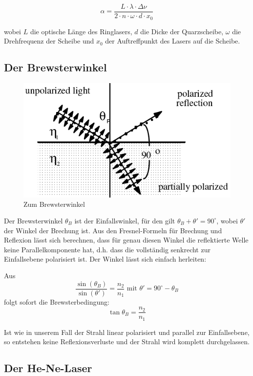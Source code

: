 \begin{equation} \alpha = \frac{L\cdot\lambda\cdot\Delta\nu}{2\cdot n\cdot\omega\cdot d \cdot x_0} \end{equation}

wobei $L$ die optische Länge des Ringlasers, $d$ die Dicke der Quarzscheibe, $\omega$ die Drehfrequenz der Scheibe und $x_0$ der Auftreffpunkt des Lasers auf die Scheibe.

\subsection{Der Brewsterwinkel}

\begin{figure}[H]
	\centering \includegraphics[width = 0.6 \textwidth]{Bilder/brewster.jpg}
	\caption{Zum Brewsterwinkel}
\end{figure}

Der Brewsterwinkel $\theta_B$ ist der Einfallswinkel, für den gilt $\theta_B + \theta' = 90^\circ$, wobei $\theta'$ der Winkel der Brechung ist. Aus den Fresnel-Formeln für Brechung und Reflexion lässt sich berechnen, dass für genau diesen Winkel die reflektierte Welle keine Parallelkomponente hat, d.h. dass die vollständig senkrecht zur Einfallsebene polarisiert ist. Der Winkel lässt sich einfach herleiten:

Aus $$ \frac{\sin(\theta_B)}{\sin(\theta')} = \frac{n_2}{n_1} \text{ \ mit \ } \theta' = 90^\circ - \theta_B$$ folgt sofort die Brewsterbedingung: 
\begin{equation} \tan\theta_B = \frac{n_2}{n_1} \end{equation}

Ist wie in unserem Fall der Strahl linear polarisiert und parallel zur Einfallsebene, so entstehen keine Reflexionsverluste und der Strahl wird komplett durchgelassen.

\subsection{Der He-Ne-Laser}

